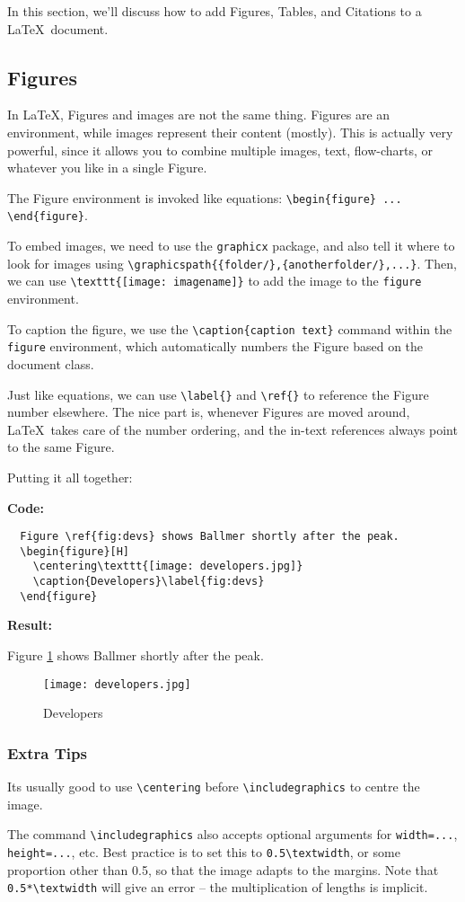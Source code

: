 In this section, we'll discuss how to add Figures, Tables, and Citations to a \LaTeX\ document.
\subsection{Figures}
In \LaTeX, Figures and images are not the same thing.
Figures are an environment, while images represent their content (mostly).
This is actually very powerful,
since it allows you to combine multiple images, text, flow-charts, or whatever you like
in a single Figure.
\par
The Figure environment is invoked like equations: \lstinline|\begin{figure} ... \end{figure}|.
\par
To embed images, we need to use the \lstinline|graphicx| package,
and also tell it where to look for images using \lstinline|\graphicspath{{folder/},{anotherfolder/},...}|.
Then, we can use \lstinline|\texttt{[image: imagename]}| to add the image to the \lstinline|figure| environment.
\par
To caption the figure, we use the \lstinline|\caption{caption text}| command within the \lstinline|figure| environment,
which automatically numbers the Figure based on the document class.
\par
Just like equations, we can use \lstinline|\label{}| and \lstinline|\ref{}| to reference the Figure number elsewhere.
The nice part is, whenever Figures are moved around, \LaTeX\ takes care of the number ordering,
and the in-text references always point to the same Figure.
\par
Putting it all together:
\par
\textbf{Code:}
\begin{lstlisting}
  Figure \ref{fig:devs} shows Ballmer shortly after the peak.
  \begin{figure}[H]
    \centering\texttt{[image: developers.jpg]}
    \caption{Developers}\label{fig:devs}
  \end{figure}
\end{lstlisting}
\textbf{Result:}
\par
Figure \ref{fig:devs} shows Ballmer shortly after the peak.
\begin{figure}[H]
  \centering\texttt{[image: developers.jpg]}
  \caption{Developers}\label{fig:devs}
\end{figure}
\subsubsection{Extra Tips}
Its usually good to use \lstinline|\centering| before \lstinline|\includegraphics| to centre the image.
\par
The command \lstinline|\includegraphics| also accepts optional arguments for \lstinline|width=...|, \lstinline|height=...|, etc.
Best practice is to set this to \lstinline|0.5\textwidth|, or some proportion other than 0.5,
so that the image adapts to the margins.
Note that \lstinline|0.5*\textwidth| will give an error -- the multiplication of lengths is implicit.
